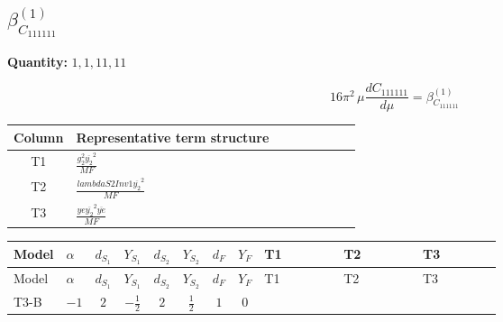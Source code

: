 \documentclass[8pt]{article}
\begin{document}
\begin{landscape}
\section*{$\beta_{C_{111111}}^{(1)}$}
\noindent\textbf{Quantity: }$\mathrm{1,1,11,11}$\par\smallskip
\[16\pi^2\,\mu\frac{d C_{111111}}{d\mu}=\beta_{C_{111111}}^{(1)}\]
\begin{center}
\begin{tabular}{@{}c >{\raggedright\arraybackslash}p{0.82\linewidth}@{}}
\toprule
Column & Representative term structure \\
\midrule
T1 & \(\displaystyle \frac{g_{2}^{2} \overline{y_{2}}^{2}}{MF}\) \\
\midrule
T2 & \(\displaystyle \frac{lambdaS2Inv1 \overline{y_{2}}^{2}}{MF}\) \\
\midrule
T3 & \(\displaystyle \frac{ye \overline{y_{2}}^{2} \overline{ye}}{MF}\) \\
\midrule
\bottomrule
\end{tabular}
\end{center}
\smallskip
\tiny
\begin{longtable}{@{}llcccccc >{\raggedright\arraybackslash}p{0.21\linewidth} >{\raggedright\arraybackslash}p{0.21\linewidth} >{\raggedright\arraybackslash}p{0.21\linewidth}@{}}
\toprule
Model & $\alpha$ & $d_{S_1}$ & $Y_{S_1}$ & $d_{S_2}$ & $Y_{S_2}$ & $d_F$ & $Y_F$ & T1 & T2 & T3 \\
\midrule
\endfirsthead
\toprule
Model & $\alpha$ & $d_{S_1}$ & $Y_{S_1}$ & $d_{S_2}$ & $Y_{S_2}$ & $d_F$ & $Y_F$ & T1 & T2 & T3 \\
\midrule
\endhead
T3-B & $-1$ & $2$ & $-\frac{1}{2}$ & $2$ & $\frac{1}{2}$ & $1$ & $0$ & \scriptsize\adjustbox{max width=\linewidth}{$\begin{gathered} - \frac{3 g_{2}^{2} \overline{y_{2}}^{2}}{4 MF}\end{gathered}$} & \scriptsize\adjustbox{max width=\linewidth}{$\begin{gathered} - \frac{lambdaS2Inv1 \overline{y_{2}}^{2}}{2 MF}\end{gathered}$} & \scriptsize\adjustbox{max width=\linewidth}{$\begin{gathered} \frac{ye \overline{y_{2}}^{2} \overline{ye}}{4 MF}\end{gathered}$} \\
\midrule
\bottomrule
\end{longtable}
\clearpage

\end{landscape}
\end{document}
